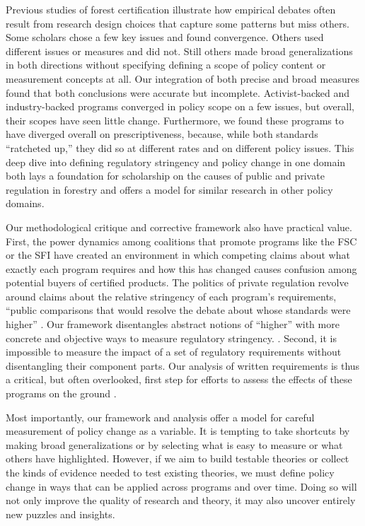 \documentclass[
      12pt,
            Review ]{article}
\begin{document}
Previous studies of forest certification illustrate how empirical debates often result from research design choices that capture some patterns but miss others. Some scholars chose a few key issues and found convergence. Others used different issues or measures and did not. Still others made broad generalizations in both directions without specifying defining a scope of policy content or measurement concepts at all. Our integration of both precise and broad measures found that both conclusions were accurate but incomplete. Activist-backed and industry-backed programs converged in policy scope on a few issues, but overall, their scopes have seen little change. Furthermore, we found these programs to have diverged overall on prescriptiveness, because, while both standards ``ratcheted up,'' they did so at different rates and on different policy issues. This deep dive into defining regulatory stringency and policy change in one domain both lays a foundation for scholarship on the causes of public and private regulation in forestry and offers a model for similar research in other policy domains.

Our methodological critique and corrective framework also have practical value. First, the power dynamics among coalitions that promote programs like the FSC or the SFI have created an environment in which competing claims about what exactly each program requires and how this has changed causes confusion among potential buyers of certified products. The politics of private regulation revolve around claims about the relative stringency of each program's requirements, ``public comparisons that would resolve the debate about whose standards were higher'' \citep{Overdevest2010}. Our framework disentangles abstract notions of ``higher'' with more concrete and objective ways to measure regulatory stringency. . Second, it is impossible to measure the impact of a set of regulatory requirements without disentangling their component parts. Our analysis of written requirements is thus a critical, but often overlooked, first step for efforts to assess the effects of these programs on the ground \citep{Hamish2018}.

Most importantly, our framework and analysis offer a model for careful measurement of policy change as a variable. It is tempting to take shortcuts by making broad generalizations or by selecting what is easy to measure or what others have highlighted. However, if we aim to build testable theories or collect the kinds of evidence needed to test existing theories, we must define policy change in ways that can be applied across programs and over time. Doing so will not only improve the quality of research and theory, it may also uncover entirely new puzzles and insights.
  \newpage 
  \theendnotes
\newpage
\singlespacing 
           
  
\end{document}

